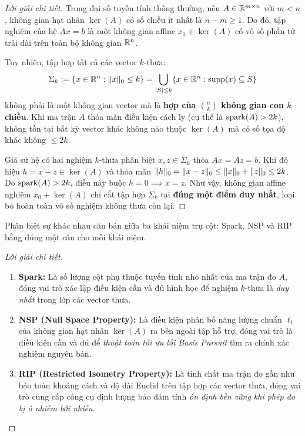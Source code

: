 \begin{proof}[Lời giải chi tiết]
Trong đại số tuyến tính thông thường, nếu $A \in \mathbb{R}^{m \times n}$ với $m < n$, không gian hạt nhân $\ker(A)$ có số chiều ít nhất là $n - m \ge 1$. Do đó, tập nghiệm của hệ $Ax = b$ là một không gian affine $x_0 + \ker(A)$ có vô số phần tử trải dài trên toàn bộ không gian $\mathbb{R}^n$.

Tuy nhiên, tập hợp tất cả các vector $k$-thưa:
\[
\Sigma_k \mathrel{\mathop:}= \{x \in \mathbb{R}^n : \|x\|_0 \le k\} = \bigcup_{|S| \le k} \{x \in \mathbb{R}^n : \operatorname{supp}(x) \subseteq S\}
\]
không phải là một không gian vector mà là \textbf{hợp của $\binom{n}{k}$ không gian con $k$ chiều}. 
Khi ma trận $A$ thỏa mãn điều kiện cách ly (cụ thể là $\operatorname{spark}(A) > 2k$), không tồn tại bất kỳ vector khác không nào thuộc $\ker(A)$ mà có số tọa độ khác không $\le 2k$. 

Giả sử hệ có hai nghiệm $k$-thưa phân biệt $x, z \in \Sigma_k$ thỏa $Ax = Az = b$. Khi đó hiệu $h = x - z \in \ker(A)$ và thỏa mãn $\|h\|_0 = \|x - z\|_0 \le \|x\|_0 + \|z\|_0 \le 2k$. Do $\operatorname{spark}(A) > 2k$, điều này buộc $h = 0 \implies x = z$. 
Như vậy, không gian affine nghiệm $x_0 + \ker(A)$ chỉ cắt tập hợp $\Sigma_k$ tại \textbf{đúng một điểm duy nhất}, loại bỏ hoàn toàn vô số nghiệm không thưa còn lại.
\end{proof}

\begin{exercise}
Phân biệt sự khác nhau căn bản giữa ba khái niệm trụ cột: Spark, NSP và RIP bằng đúng một câu cho mỗi khái niệm.
\end{exercise}

\begin{proof}[Lời giải chi tiết]
\begin{enumerate}
    \item \textbf{Spark:} Là số lượng cột phụ thuộc tuyến tính nhỏ nhất của ma trận đo $A$, đóng vai trò xác lập điều kiện cần và đủ hình học để nghiệm $k$-thưa là \emph{duy nhất} trong lớp các vector thưa.
    \item \textbf{NSP (Null Space Property):} Là điều kiện phân bố năng lượng chuẩn $\ell_1$ của không gian hạt nhân $\ker(A)$ ra bên ngoài tập hỗ trợ, đóng vai trò là điều kiện cần và đủ để \emph{thuật toán tối ưu lồi Basis Pursuit} tìm ra chính xác nghiệm nguyên bản.
    \item \textbf{RIP (Restricted Isometry Property):} Là tính chất ma trận đo gần như bảo toàn khoảng cách và độ dài Euclid trên tập hợp các vector thưa, đóng vai trò cung cấp công cụ định lượng bảo đảm tính \emph{ổn định bền vững khi phép đo bị ô nhiễm bởi nhiễu}.
\end{enumerate}
\end{proof}

